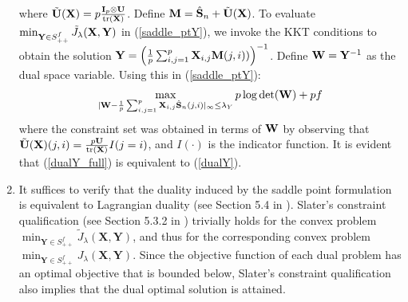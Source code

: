 \begin{IEEEproof}
\begin{enumerate}
\begin{equation*}
	\end{equation*}
	where $\tilde{\mathbf{U}}(\mathbf{X})=p \frac{{\mathbf{I}}_p \otimes {\mathbf{U}}}{{ \text{tr} }({\mathbf{X}})}$. Define ${\mathbf{M}}=\hat{{\mathbf{S}}}_n + \tilde{{\mathbf{U}}}({\mathbf{X}})$. To evaluate $\min_{{\mathbf{Y}} \in S_{++}^f}{\tilde{J}_\lambda({\mathbf{X}},{\mathbf{Y}})}$ in (\ref{saddle_ptY}), we invoke the KKT conditions to obtain the solution ${\mathbf{Y}}=\left( \frac{1}{p} \sum_{i,j=1}^p{{\mathbf{X}}_{i,j} {\mathbf{M}}(j,i))} \right)^{-1}$. Define ${\mathbf{W}}={\mathbf{Y}}^{-1}$ as the dual space variable. Using this in (\ref{saddle_ptY}):
	\begin{equation} \label{dualY_full}
		\max_{|{\mathbf{W}}-\frac{1}{p}\sum_{i,j=1}^p{{\mathbf{X}}_{i,j} \hat{{\mathbf{S}}}_n(j,i)}|_{\infty}\leq \lambda_Y } p \log\det(\mathbf{W}) + pf
	\end{equation}
	where the constraint set was obtained in terms of ${\mathbf{W}}$ by observing that $\tilde{\mathbf{U}}(\mathbf{X})(j,i) = \frac{p \mathbf{U}}{{ \text{tr} }(\mathbf{X})} I(j=i)$, and $I(\cdot)$ is the indicator function. 
	It is evident that (\ref{dualY_full}) is equivalent to (\ref{dualY}).

	\item It suffices to verify that the duality induced by the saddle point formulation is equivalent to Lagrangian duality (see Section 5.4 in \cite{ConvexOpt}). Slater's constraint qualification (see Section 5.3.2 in \cite{ConvexOpt}) trivially holds for the convex problem $\min_{\mathbf{Y} \in S_{++}^f}\tilde{J}_\lambda(\mathbf{X},\mathbf{Y})$, and thus for the corresponding convex problem $\min_{\mathbf{Y} \in S_{++}^f}J_\lambda(\mathbf{X},\mathbf{Y})$. Since the objective function of each dual problem has an optimal objective that is bounded below, Slater's constraint qualification also implies that the dual optimal solution is attained.


\end{enumerate}
\end{IEEEproof}
